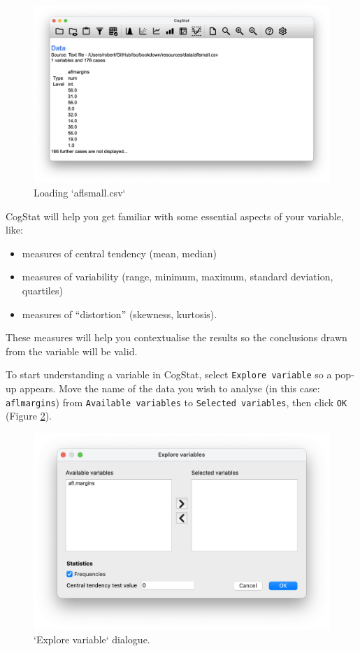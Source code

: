 \documentclass[
  11pt,
  a4paper,
  twoside,symmetric,openright]{book}
\providecommand{\tightlist}{%
  \setlength{\itemsep}{0pt}\setlength{\parskip}{0pt}}
\theoremstyle{break}
\theoremstyle{break}
\begin{document}
\begin{figure}

{\centering \includegraphics[width=0.6\linewidth]{resources/image/loadaflsmall} 

}

\caption{Loading `aflsmall.csv`}\label{fig:loadaflsmall}
\end{figure}

CogStat will help you get familiar with some essential aspects of your variable, like:

\begin{itemize}
\tightlist
\item
  measures of central tendency (mean, median)
\item
  measures of variability (range, minimum, maximum, standard deviation, quartiles)
\item
  measures of ``distortion'' (skewness, kurtosis).
\end{itemize}

These measures will help you contextualise the results so the conclusions drawn from the variable will be valid.

To start understanding a variable in CogStat, select \texttt{Explore\ variable} so a pop-up appears. Move the name of the data you wish to analyse (in this case: \texttt{aflmargins}) from \texttt{Available\ variables} to \texttt{Selected\ variables}, then click \texttt{OK} (Figure \ref{fig:explorevariabledialog}).

\begin{figure}

{\centering \includegraphics[width=0.6\linewidth]{resources/image/explorevariable} 

}

\caption{`Explore variable` dialogue.}\label{fig:explorevariabledialog}
\end{figure}
\end{document}
